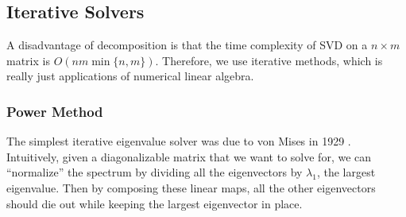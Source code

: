 \subsection{Iterative Solvers} 

  A disadvantage of decomposition is that the time complexity of SVD on a $n \times m$ matrix is $O(nm \min\{n, m\})$. Therefore, we use iterative methods, which is really just applications of numerical linear algebra. 

\subsubsection{Power Method} 

  The simplest iterative eigenvalue solver was due to von Mises in 1929 \cite{1929vonmises}. Intuitively, given a diagonalizable matrix that we want to solve for, we can  ``normalize'' the spectrum by dividing all the eigenvectors by $\lambda_1$, the largest eigenvalue. Then by composing these linear maps, all the other eigenvectors should die out while keeping the largest eigenvector in place. 

